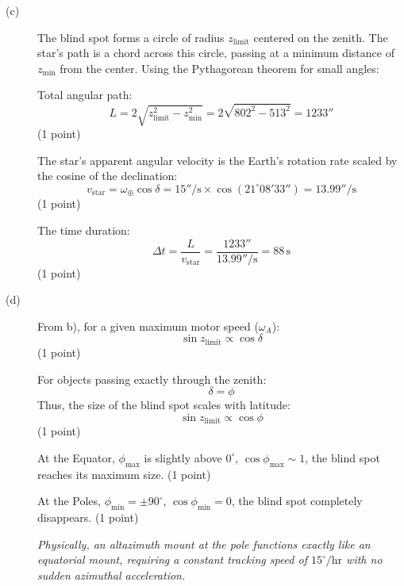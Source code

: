 \begin{description}
\item[(c)] The blind spot forms a circle of radius $z_{\mathrm{limit}}$
  centered on the zenith. The star's path is a chord across this circle,
  passing at a minimum distance of $z_{\mathrm{min}}$ from the center. Using
  the Pythagorean theorem for small angles:

  Total angular path:
  \[ L = 2\sqrt{z_{\mathrm{limit}}^2 - z_{\mathrm{min}}^2}
       = 2\sqrt{802^2 - 513^2} = 1233'' \]
  \hfill(1 point)

  The star's apparent angular velocity is the Earth's rotation rate scaled by
  the cosine of the declination:
  \[ v_{\mathrm{star}} = \omega_\oplus \cos\delta
     = 15''/\mathrm{s} \times \cos(21^\circ 08' 33'') = 13.99''/\mathrm{s} \]
  \hfill(1 point)

  The time duration:
  \[ \Delta t = \frac{L}{v_{\mathrm{star}}}
     = \frac{1233''}{13.99''/\mathrm{s}} = 88\,\mathrm{s} \]
  \hfill(1 point)

\item[(d)] From b), for a given maximum motor speed ($\omega_A$):
  \[ \sin z_{\mathrm{limit}} \propto \cos\delta \]
  \hfill(1 point)

  For objects passing exactly through the zenith:
  \[ \delta = \phi \]
  Thus, the size of the blind spot scales with latitude:
  \[ \sin z_{\mathrm{limit}} \propto \cos\phi \]
  \hfill(1 point)

  At the Equator, $\phi_{\mathrm{max}}$ is slightly above $0^\circ$,
  $\cos\phi_{\mathrm{max}} \sim 1$, the blind spot reaches its maximum size.
  \hfill(1 point)

  At the Poles, $\phi_{\mathrm{min}} = \pm 90^\circ$,
  $\cos\phi_{\mathrm{min}} = 0$, the blind spot completely disappears.
  \hfill(1 point)

  \textit{Physically, an altazimuth mount at the pole functions exactly like
  an equatorial mount, requiring a constant tracking speed of
  $15^\circ/\mathrm{hr}$ with no sudden azimuthal acceleration.}
\end{description}
